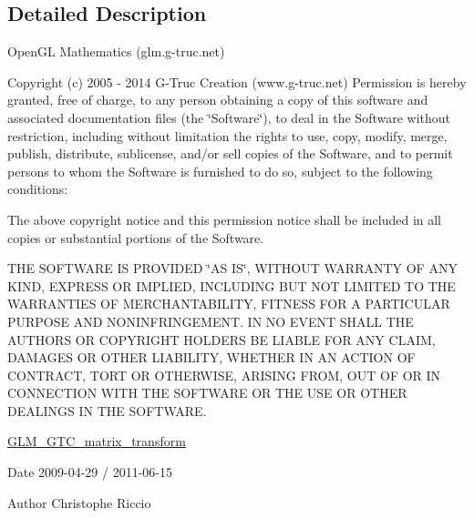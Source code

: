 \subsection{Detailed Description}
Open\+GL Mathematics (glm.\+g-\/truc.\+net)

Copyright (c) 2005 -\/ 2014 G-\/\+Truc Creation (www.\+g-\/truc.\+net) Permission is hereby granted, free of charge, to any person obtaining a copy of this software and associated documentation files (the \char`\"{}\+Software\char`\"{}), to deal in the Software without restriction, including without limitation the rights to use, copy, modify, merge, publish, distribute, sublicense, and/or sell copies of the Software, and to permit persons to whom the Software is furnished to do so, subject to the following conditions\+:

The above copyright notice and this permission notice shall be included in all copies or substantial portions of the Software.

T\+HE S\+O\+F\+T\+W\+A\+RE IS P\+R\+O\+V\+I\+D\+ED \char`\"{}\+A\+S I\+S\char`\"{}, W\+I\+T\+H\+O\+UT W\+A\+R\+R\+A\+N\+TY OF A\+NY K\+I\+ND, E\+X\+P\+R\+E\+SS OR I\+M\+P\+L\+I\+ED, I\+N\+C\+L\+U\+D\+I\+NG B\+UT N\+OT L\+I\+M\+I\+T\+ED TO T\+HE W\+A\+R\+R\+A\+N\+T\+I\+ES OF M\+E\+R\+C\+H\+A\+N\+T\+A\+B\+I\+L\+I\+TY, F\+I\+T\+N\+E\+SS F\+OR A P\+A\+R\+T\+I\+C\+U\+L\+AR P\+U\+R\+P\+O\+SE A\+ND N\+O\+N\+I\+N\+F\+R\+I\+N\+G\+E\+M\+E\+NT. IN NO E\+V\+E\+NT S\+H\+A\+LL T\+HE A\+U\+T\+H\+O\+RS OR C\+O\+P\+Y\+R\+I\+G\+HT H\+O\+L\+D\+E\+RS BE L\+I\+A\+B\+LE F\+OR A\+NY C\+L\+A\+IM, D\+A\+M\+A\+G\+ES OR O\+T\+H\+ER L\+I\+A\+B\+I\+L\+I\+TY, W\+H\+E\+T\+H\+ER IN AN A\+C\+T\+I\+ON OF C\+O\+N\+T\+R\+A\+CT, T\+O\+RT OR O\+T\+H\+E\+R\+W\+I\+SE, A\+R\+I\+S\+I\+NG F\+R\+OM, O\+UT OF OR IN C\+O\+N\+N\+E\+C\+T\+I\+ON W\+I\+TH T\+HE S\+O\+F\+T\+W\+A\+RE OR T\+HE U\+SE OR O\+T\+H\+ER D\+E\+A\+L\+I\+N\+GS IN T\+HE S\+O\+F\+T\+W\+A\+RE.

\hyperlink{group__gtc__matrix__transform}{G\+L\+M\+\_\+\+G\+T\+C\+\_\+matrix\+\_\+transform}

\begin{DoxyDate}{Date}
2009-\/04-\/29 / 2011-\/06-\/15 
\end{DoxyDate}
\begin{DoxyAuthor}{Author}
Christophe Riccio 
\end{DoxyAuthor}
